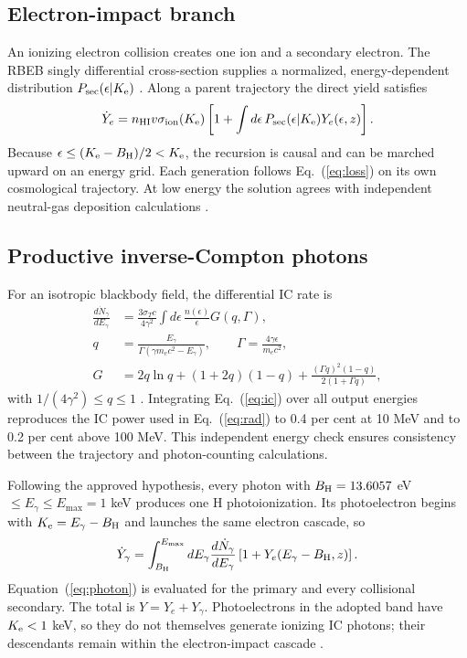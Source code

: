 \documentclass[10pt,twocolumn]{article}
\newcommand{\Ke}{K_{\rm e}}
\begin{document}
\subsection{Electron-impact branch}

An ionizing electron collision creates one ion and a secondary electron. The
RBEB singly differential cross-section supplies a normalized, energy-dependent
distribution $P_{\rm sec}(\epsilon|\Ke)$ \citep{KimRudd1994}. Along a parent
trajectory the direct yield satisfies
\begin{equation}
 \dot Y_e=n_{\rm HI}v\sigma_{\rm ion}(\Ke)
 \left[1+\int d\epsilon\,P_{\rm sec}(\epsilon|\Ke)
 Y_e(\epsilon,z)\right].                                      \label{eq:electron}
\end{equation}
Because $\epsilon\le(\Ke-B_{\rm H})/2<\Ke$, the recursion is causal and can be
marched upward on an energy grid. Each generation follows Eq.~(\ref{eq:loss})
on its own cosmological trajectory. At low energy the solution agrees with
independent neutral-gas deposition calculations
\citep{Shull1985,Furlanetto2010}.

\subsection{Productive inverse-Compton photons}

For an isotropic blackbody field, the differential IC rate is
\begin{align}
 \frac{d\dot N_\gamma}{dE_\gamma}
 &=\frac{3\sigma_Tc}{4\gamma^2}
 \int d\epsilon\,\frac{n(\epsilon)}{\epsilon}G(q,\Gamma),     \label{eq:ic}\\[-2pt]
 q&=\frac{E_\gamma}{\Gamma(\gamma m_ec^2-E_\gamma)},\qquad
 \Gamma=\frac{4\gamma\epsilon}{m_ec^2},\nonumber\\[-2pt]
 G&=2q\ln q+(1+2q)(1-q)
 +\frac{(\Gamma q)^2(1-q)}{2(1+\Gamma q)},\nonumber
\end{align}
with $1/(4\gamma^2)\le q\le1$ \citep{Blumenthal1970}. Integrating
Eq.~(\ref{eq:ic}) over all output energies reproduces the IC power used in
Eq.~(\ref{eq:rad}) to 0.4 per cent at 10 MeV and to 0.2 per cent above
100 MeV. This independent energy check ensures consistency between the
trajectory and photon-counting calculations.

Following the approved hypothesis, every photon with
$B_{\rm H}=13.6057$ eV $\le E_\gamma\le E_{\max}=1$ keV produces one H
photoionization. Its photoelectron begins with
$\Ke=E_\gamma-B_{\rm H}$ and launches the same electron cascade, so
\begin{equation}
 \dot Y_\gamma=\int_{B_{\rm H}}^{E_{\max}}dE_\gamma
 \frac{d\dot N_\gamma}{dE_\gamma}
 \left[1+Y_e(E_\gamma-B_{\rm H},z)\right].                    \label{eq:photon}
\end{equation}
Equation~(\ref{eq:photon}) is evaluated for the primary and every collisional
secondary. The total is $Y=Y_e+Y_\gamma$. Photoelectrons in the adopted band
have $\Ke<1$ keV, so they do not themselves generate ionizing IC photons; their
descendants remain within the electron-impact cascade
\citep{Furlanetto2010,Slatyer2009}.
\end{document}
